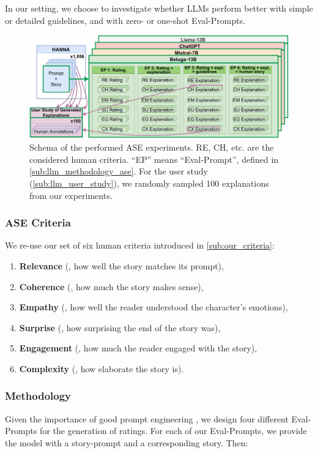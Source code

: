 In our setting, we choose to investigate whether LLMs perform better with simple or detailed guidelines, and with zero- or one-shot Eval-Prompts.


\begin{figure}[!h]
    \centering
    \includegraphics[width=\columnwidth]{pictures/llm_schema.pdf}
    \caption{Schema of the performed ASE experiments. RE, CH, etc. are the considered human criteria. ``EP'' means ``Eval-Prompt'', defined in \autoref{sub:llm_methodology_ase}. For the user study (\autoref{sub:llm_user_study}), we randomly sampled 100 explanations from our experiments.}
    \label{fig:llm_schema}
\end{figure}

\subsubsection{ASE Criteria} We re-use our set of six human criteria introduced in \autoref{sub:our_criteria}:
\begin{enumerate}[noitemsep]
    \item \textbf{Relevance} ({\myre}, how well the story matches its prompt), 
    \item \textbf{Coherence} ({\mych}, how much the story makes sense), 
    \item \textbf{Empathy} ({\myem}, how well the reader understood the character's emotions),
    \item \textbf{Surprise} ({\mysu}, how surprising the end of the story was),
    \item \textbf{Engagement} ({\myeg}, how much the reader engaged with the story),
    \item \textbf{Complexity} ({\mycx}, how elaborate the story is).
\end{enumerate}

\subsubsection{Methodology}
Given the importance of good prompt engineering \citep{zhao2021calibrate}, we design four different Eval-Prompts for the generation of ratings. For each of our Eval-Prompts, we provide the model with a story-prompt and a corresponding story. Then:

